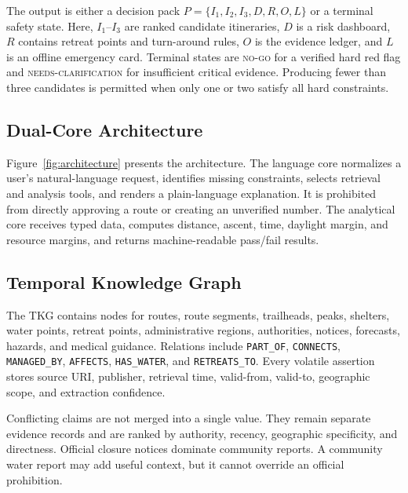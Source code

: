 \documentclass[conference]{IEEEtran}
\begin{document}
The output is either a decision pack
$P=\{I_1,I_2,I_3,D,R,O,L\}$ or a terminal safety state. Here, $I_1$--$I_3$ are
ranked candidate itineraries, $D$ is a risk dashboard, $R$ contains retreat
points and turn-around rules, $O$ is the evidence ledger, and $L$ is an
offline emergency card. Terminal states are \textsc{no-go} for a verified
hard red flag and \textsc{needs-clarification} for insufficient critical
evidence. Producing fewer than three candidates is permitted when only one or
two satisfy all hard constraints.

\subsection{Dual-Core Architecture}
Figure~\ref{fig:architecture} presents the architecture. The language core
normalizes a user's natural-language request, identifies missing constraints,
selects retrieval and analysis tools, and renders a plain-language
explanation. It is prohibited from directly approving a route or creating an
unverified number. The analytical core receives typed data, computes
distance, ascent, time, daylight margin, and resource margins, and returns
machine-readable pass/fail results.

\subsection{Temporal Knowledge Graph}
The TKG contains nodes for routes, route segments, trailheads, peaks, shelters,
water points, retreat points, administrative regions, authorities, notices,
forecasts, hazards, and medical guidance. Relations include
\texttt{PART\_OF}, \texttt{CONNECTS}, \texttt{MANAGED\_BY},
\texttt{AFFECTS}, \texttt{HAS\_WATER}, and \texttt{RETREATS\_TO}. Every
volatile assertion stores source URI, publisher, retrieval time, valid-from,
valid-to, geographic scope, and extraction confidence.

Conflicting claims are not merged into a single value. They remain separate
evidence records and are ranked by authority, recency, geographic
specificity, and directness. Official closure notices dominate community
reports. A community water report may add useful context, but it cannot
override an official prohibition.
\end{document}
